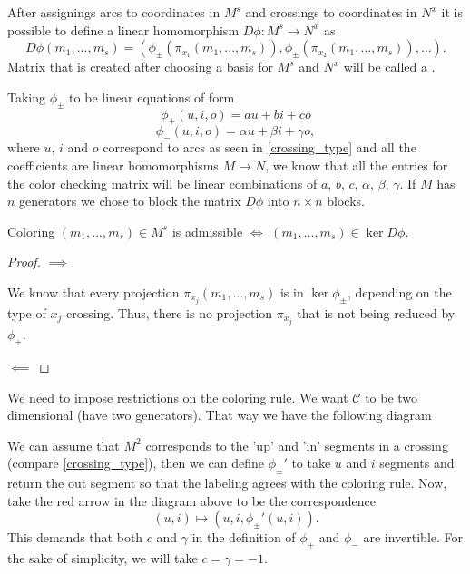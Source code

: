 \begin{definition}\label{def:color checking matrix}
  After assignings arcs to coordinates in $M^s$ and crossings to coordinates in $N^x$ it is possible to define a linear homomorphism $D\phi:M^s\to N^x$  as
  $$D\phi(m_1,...,m_s)=(\phi_\pm(\pi_{x_1}(m_1,...,m_s)), \phi_\pm(\pi_{x_2}(m_1,...,m_s)),...).$$
  Matrix that is created after choosing a basis for $M^s$ and $N^x$ will be called a .
\end{definition}

Taking $\phi_\pm$ to be linear equations of form
$$\phi_+(u,i,o)=au+bi+co$$
$$\phi_-(u,i,o)=\alpha u+\beta i+\gamma o,$$
where $u$, $i$ and $o$ correspond to arcs as seen in \cref{crossing_type} and all the coefficients are linear homomorphisms $M\to N$, we know that all the entries for the color checking matrix will be linear combinations of $a$, $b$, $c$, $\alpha$, $\beta$, $\gamma$. If $M$ has $n$ generators we chose to block the matrix $D\phi$ into $n\times n$ blocks.

\begin{proposition}
  Coloring $(m_1,...,m_s)\in M^s$ is admissible $\iff$ $(m_1,...,m_s)\in\ker D\phi$.
\end{proposition}

\begin{proof}\color{blue}
  $\implies$

  We know that every projection $\pi_{x_j}(m_1,...,m_s)$ is in $\ker\phi_\pm$, depending on the type of $x_j$ crossing. Thus, there is no projection $\pi_{x_j}$ that is not being reduced by $\phi_\pm$.

  $\impliedby$

\end{proof}

{\color{blue}We need to impose restrictions on the coloring rule.} We want $\mathcal{C}$ to be two dimensional (have two generators). That way we have the following diagram
\begin{center}
\end{center}
We can assume that $M^2$ corresponds to the 'up' and 'in' segments in a crossing (compare \cref{crossing_type}), then we can define $\phi_\pm'$ to take $u$ and $i$ segments and return the out segment so that the labeling agrees with the coloring rule. Now, take the red arrow in the diagram above to be the correspondence
$$(u, i)\mapsto (u, i, \phi_\pm'(u,i)).$$
This demands that both $c$ and $\gamma$ in the definition of $\phi_+$ and $\phi_-$ are invertible. For the sake of simplicity, we will take $c=\gamma=-1$. 

